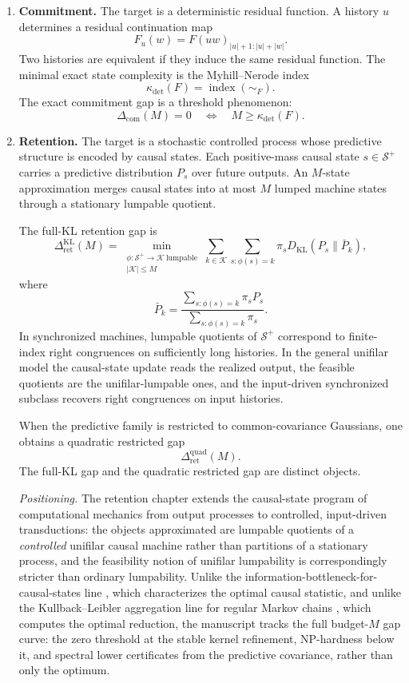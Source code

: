 \documentclass[12pt]{article}
\theoremstyle{definition}
\newcommand{\RetKL}{\Delta_{\mathrm{ret}}^{\mathrm{KL}}}
\newcommand{\RetQuad}{\Delta_{\mathrm{ret}}^{\mathrm{quad}}}
\newcommand{\Com}{\Delta_{\mathrm{com}}}
\newcommand{\Splus}{\mathcal S^{+}}
\begin{document}
\begin{enumerate}[label=(\arabic*),leftmargin=2.2em]
\item \textbf{Commitment.}
The target is a deterministic residual function.  A history $u$ determines a
residual continuation map
\[
F_u(w)=F(uw)_{|u|+1:|u|+|w|}.
\]
Two histories are equivalent if they induce the same residual function.  The
minimal exact state complexity is the Myhill--Nerode index
\[
\kappa_{\det}(F)
=
\operatorname{index}(\sim_F).
\]
The exact commitment gap is a threshold phenomenon:
\[
\Com(M)=0
\quad\Longleftrightarrow\quad
M\ge\kappa_{\det}(F).
\]

\item \textbf{Retention.}
The target is a stochastic controlled process whose predictive structure is
encoded by causal states.  Each positive-mass causal state $s\in\Splus$
carries a predictive distribution $P_s$ over future outputs.  An $M$-state
approximation merges causal states into at most $M$ lumped machine states
through a stationary lumpable quotient.

The full-KL retention gap is
\[
\RetKL(M)
=
\min_{\substack{
\phi:\Splus\to\mathcal K\ \text{lumpable}\\
|\mathcal K|\le M
}}
\sum_{k\in\mathcal K}
\sum_{s:\phi(s)=k}
\pi_s
D_{\mathrm{KL}}(P_s\|\bar P_k),
\]
where
\[
\bar P_k
=
\frac{
\sum_{s:\phi(s)=k}\pi_s P_s
}{
\sum_{s:\phi(s)=k}\pi_s
}.
\]
In synchronized machines, lumpable quotients of $\Splus$ correspond to
finite-index right congruences on sufficiently long histories.  In the general
unifilar model the causal-state update reads the realized output, the feasible
quotients are the unifilar-lumpable ones, and the input-driven synchronized
subclass recovers right congruences on input histories.

When the predictive family is restricted to common-covariance Gaussians, one
obtains a quadratic restricted gap
\[
\RetQuad(M).
\]
The full-KL gap and the quadratic restricted gap are distinct objects.

\emph{Positioning.}  The retention chapter extends the causal-state program of
computational mechanics \cite{shalizi2001} from output processes to
controlled, input-driven transductions: the objects approximated are lumpable
quotients of a \emph{controlled} unifilar causal machine rather than
partitions of a stationary process, and the feasibility notion of unifilar
lumpability is correspondingly stricter than ordinary lumpability.  Unlike the
information-bottleneck-for-causal-states line
\cite{shalizicrutchfield2002,marzencrutchfield2014}, which characterizes the
optimal causal statistic, and unlike the Kullback--Leibler aggregation line for
regular Markov chains \cite{geiger2015,geiger2026}, which computes the optimal
reduction, the manuscript tracks the full budget-$M$ gap curve: the zero
threshold at the stable kernel refinement, NP-hardness below it, and spectral
lower certificates from the predictive covariance, rather than only the
optimum.


\end{enumerate}
\end{document}
